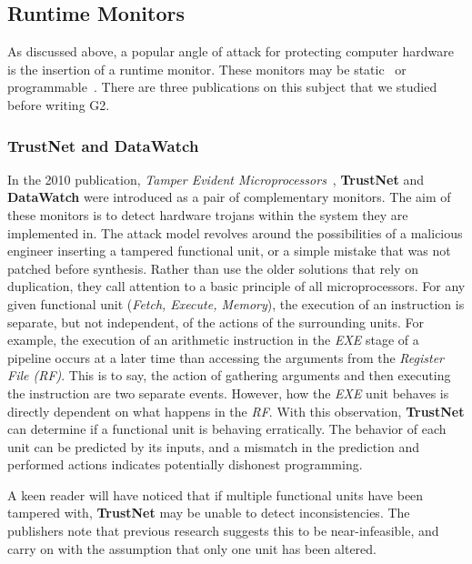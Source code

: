 \documentclass[sigconf,usenames,dvipsnames,svgnames,table]{acmart}
\def \sysname {\textsc{G2}\xspace}
\begin{document}
    \subsection{Runtime Monitors}\label{sec:prior:runtime}
      As discussed above, a popular angle of attack for protecting computer hardware is the insertion of a runtime monitor.
      These monitors may be static~\cite{2010trustnetdatawatch} or programmable~\cite{2007raksha, 2014pump}.
      There are three publications on this subject that we studied before writing \sysname.

      \subsubsection{TrustNet and DataWatch}\label{sec:prior:runtime:tndw}
        In the 2010 publication, \textit{Tamper Evident Microprocessors}~\cite{2010trustnetdatawatch}, \textbf{TrustNet} and \textbf{DataWatch} were introduced as a pair of complementary monitors.
        The aim of these monitors is to detect hardware trojans within the system they are implemented in.
        The attack model revolves around the possibilities of a malicious engineer inserting a tampered functional unit, or a simple mistake that was not patched before synthesis.
        Rather than use the older solutions that rely on duplication, they call attention to a basic principle of all microprocessors.
        For any given functional unit (\textit{Fetch, Execute, Memory}), the execution of an instruction is separate, but not independent, of the actions of the surrounding units.
        For example, the execution of an arithmetic instruction in the \textit{EXE} stage of a pipeline occurs at a later time than accessing the arguments from the \textit{Register File (RF)}.
        This is to say, the action of gathering arguments and then executing the instruction are two separate events.
        However, how the \textit{EXE} unit behaves is directly dependent on what happens in the \textit{RF}.
        With this observation, \textbf{TrustNet} can determine if a functional unit is behaving erratically.
        The behavior of each unit can be predicted by its inputs, and a mismatch in the prediction and performed actions indicates potentially dishonest programming.
        \par

        A keen reader will have noticed that if multiple functional units have been tampered with, \textbf{TrustNet} may be unable to detect inconsistencies.
        The publishers note that previous research suggests this to be near-infeasible, and carry on with the assumption that only one unit has been altered.
        \par
\end{document}
